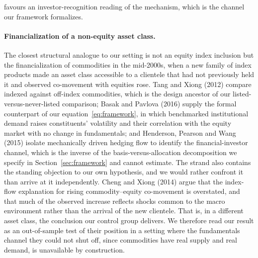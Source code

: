 \documentclass[12pt,a4paper]{article}
\begin{document}
favours an investor-recognition reading of the mechanism, which is the channel our framework formalizes.

\paragraph{Financialization of a non-equity asset class.} The closest structural analogue to our setting is not an equity index inclusion but the financialization of commodities in the mid-2000s, when a new family of index products made an asset class accessible to a clientele that had not previously held it and observed co-movement with equities rose. Tang and Xiong (2012) compare indexed against off-index commodities, which is the design ancestor of our listed-versus-never-listed comparison; Basak and Pavlova (2016) supply the formal counterpart of our equation~\eqref{eq:framework}, in which benchmarked institutional demand raises constituents' volatility and their correlation with the equity market with no change in fundamentals; and Henderson, Pearson and Wang (2015) isolate mechanically driven hedging flow to identify the financial-investor channel, which is the inverse of the basis-versus-allocation decomposition we specify in Section~\ref{sec:framework} and cannot estimate. The strand also contains the standing objection to our own hypothesis, and we would rather confront it than arrive at it independently. Cheng and Xiong (2014) argue that the index-flow explanation for rising commodity--equity co-movement is overstated, and that much of the observed increase reflects shocks common to the macro environment rather than the arrival of the new clientele. That is, in a different asset class, the conclusion our control group delivers. We therefore read our result as an out-of-sample test of their position in a setting where the fundamentals channel they could not shut off, since commodities have real supply and real demand, is unavailable by construction.
\end{document}

